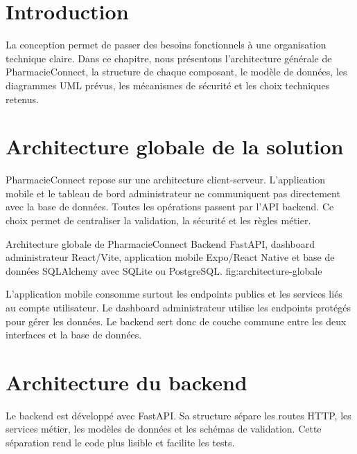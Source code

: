 \section{Introduction}

La conception permet de passer des besoins fonctionnels à une organisation technique claire. Dans ce
chapitre, nous présentons l'architecture générale de PharmacieConnect, la structure de chaque composant,
le modèle de données, les diagrammes UML prévus, les mécanismes de sécurité et les choix techniques
retenus.

\section{Architecture globale de la solution}

PharmacieConnect repose sur une architecture client-serveur. L'application mobile et le tableau de bord
administrateur ne communiquent pas directement avec la base de données. Toutes les opérations passent
par l'API backend. Ce choix permet de centraliser la validation, la sécurité et les règles métier.

\placeholderfigure
{Architecture globale de PharmacieConnect}
{Backend FastAPI, dashboard administrateur React/Vite, application mobile Expo/React Native et base de données SQLAlchemy avec SQLite ou PostgreSQL.}
{fig:architecture-globale}

L'application mobile consomme surtout les endpoints publics et les services liés au compte utilisateur. Le
dashboard administrateur utilise les endpoints protégés pour gérer les données. Le backend sert donc de
couche commune entre les deux interfaces et la base de données.

\section{Architecture du backend}

Le backend est développé avec FastAPI. Sa structure sépare les routes HTTP, les services métier, les
modèles de données et les schémas de validation. Cette séparation rend le code plus lisible et facilite
les tests.


